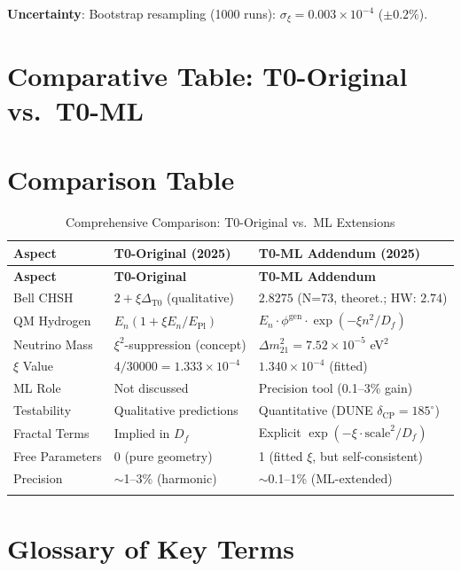 	\textbf{Uncertainty}: Bootstrap resampling (1000 runs): $\sigma_\xi = 0.003\times10^{-4}$ ($\pm0.2\%$).
	
	\section{Comparative Table: T0-Original vs.~T0-ML}
	
	\section*{Comparison Table}
	\begin{longtable}{p{2.4cm}p{4.0cm}p{4.0cm}}
		\toprule
		\textbf{Aspect} & \textbf{T0-Original (2025)} & \textbf{T0-ML Addendum (2025)} \\
		\midrule
		\endfirsthead
		\toprule
		\textbf{Aspect} & \textbf{T0-Original} & \textbf{T0-ML Addendum} \\
		\midrule
		\endhead
		
		Bell CHSH & $2 + \xi\Delta_{\text{T0}}$ (qualitative) & $2.8275$ (N=73, theoret.; HW: $2.74$) \\
		QM Hydrogen & $E_n(1+\xi E_n/E_{\text{Pl}})$ & $E_n \cdot \phi^{\text{gen}} \cdot \exp(-\xi n^2/D_f)$ \\
		Neutrino Mass & $\xi^2$-suppression (concept) & $\Delta m_{21}^2=7.52\times10^{-5}$ eV$^2$ \\
		$\xi$ Value & $4/30000=1.333\times10^{-4}$ & $1.340\times10^{-4}$ (fitted) \\
		ML Role & Not discussed & Precision tool (0.1--3\% gain) \\
		Testability & Qualitative predictions & Quantitative (DUNE $\delta_{\text{CP}}=185^\circ$) \\
		Fractal Terms & Implied in $D_f$ & Explicit $\exp(-\xi \cdot \text{scale}^2/D_f)$ \\
		Free Parameters & 0 (pure geometry) & 1 (fitted $\xi$, but self-consistent) \\
		Precision & $\sim$1--3\% (harmonic) & $\sim$0.1--1\% (ML-extended) \\
		\bottomrule
		\caption{Comprehensive Comparison: T0-Original vs.~ML Extensions}
	\end{longtable}
	
	\section{Glossary of Key Terms}
	
